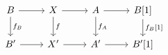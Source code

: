 \documentclass[12pt]{standalone}
\begin{document}
        $$
 
\begin{tikzcd}
B \ar[r] \ar[d,"f_B"] & X \ar[r] \ar[d,"f"] & A \ar[d,"f_A"] \ar[r] & B[1] \ar[d,"{f_B[1]}"] \\
B^\prime \ar[r] & X^\prime \ar[r] & A^\prime \ar[r] & B^\prime[1]
\end{tikzcd}
        $$
        
\end{document}
